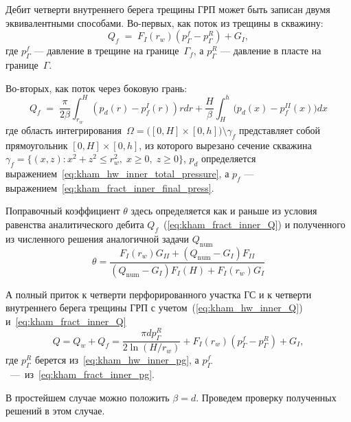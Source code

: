 \documentclass{article}
\newcommand{\mysub}[1]{%
  \par\vspace{0.5em}\noindent{\normalsize\underline{#1}}\par\vspace{0.5em}%
}
\begin{document}
Дебит четверти внутреннего берега трещины ГРП может быть записан двумя эквивалентными способами.
Во-первых, как поток из трещины в скважину:
\begin{equation}
	Q_f \;=\; F_I\left(r_w\right) \left(p^f_{\Gamma} - p^R_{\Gamma}\right) + G_I,
	\label{eq:kham_fract_inner_Q}
\end{equation}
где $p^f_{\Gamma}$ --- давление в трещине на границе~$\Gamma_f$, а $p^R_{\Gamma}$ --- давление в пласте на границе~$\Gamma$.


Во-вторых, как поток через боковую грань:
\begin{equation}
	Q_f \;=\; \dfrac{\pi}{2 \beta} \int_{r_w}^H \left( p_d(r) - p_f^I(r)\right) r dr +
	\frac{H}{ \beta} \int_H^h \bigl(p_d(x) - p_f^{II}(x)\bigr) dx
	\label{eq:kham_fract_inner_Q2}
\end{equation}
где область интегрирования~$\Omega = \bigl([0,H]\times[0,h]\bigr)\setminus \gamma_f$ представляет собой прямоугольник $[0,H]\times[0,h]$,
из которого вырезано сечение скважина~$\gamma_f = \{(x,z): x^2+z^2 \le r_w^2,\; x \ge 0,\; z \ge 0\}$, $p_d$
определяется выражением~\eqref{eq:kham_hw_inner_total_pressure},
а $p_f$ --- выражением~\eqref{eq:kham_fract_inner_final_press}.


Поправочный коэффициент $\theta$ здесь определяется как и раньше из условия равенства аналитического
дебита $Q_f$~(\ref{eq:kham_fract_inner_Q}) и полученного из численного решения аналогичной задачи $Q_{\text{num}}$
\begin{equation}
	\displaystyle
	\theta = \dfrac{
	F_I\left(r_w\right) G_{II} + \left(Q_{\text{num}} - G_I\right)F_{II}
	}
	{
	\left(Q_{\text{num}} - G_I\right) F_I\left(H\right) + F_I\left(r_w\right) G_I
	}
	\label{eq:kham_fract_inner_theta}
\end{equation}

А полный приток  к четверти перфорированного участка ГС и к четверти внутреннего берега трещины ГРП
с учетом~(\ref{eq:kham_hw_inner_Q}) и~\eqref{eq:kham_fract_inner_Q}
\begin{equation}
	\displaystyle
	Q = Q_w + Q_f = \dfrac{\pi d p^R_{\Gamma}}{2 \ln{\left(H / r_w\right)}} + F_I\left(r_w\right) \left(p^f_{\Gamma} - p^R_{\Gamma}\right) + G_I,
	\label{eq:kham_fract_inner_q_total}
\end{equation}
где $p^R_{\Gamma}$ берется из~\eqref{eq:kham_hw_inner_pg}, а $p^f_{\Gamma}$~---~из~\eqref{eq:kham_fract_inner_pg}.

\mysub{Выбор коэффициента~$\beta$}

В простейшем случае можно положить $\beta = d$.
Проведем проверку полученных решений в этом случае.
\end{document}

